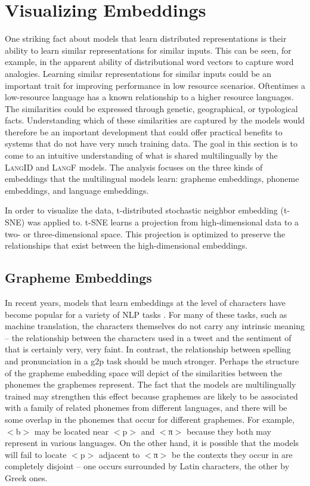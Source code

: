 \section{Visualizing Embeddings}
One striking fact about models that learn distributed representations is their ability to learn similar representations for similar inputs. This can be seen, for example, in the apparent ability of distributional word vectors to capture word analogies. Learning similar representations for similar inputs could be an important trait for improving performance in low resource scenarios. Oftentimes a low-resource language has a known relationship to a higher resource languages. The similarities could be expressed through genetic, geographical, or typological facts. Understanding which of these similarities are captured by the models would therefore be an important development that could offer practical benefits to systems that do not have very much training data. The goal in this section is to come to an intuitive understanding of what is shared multilingually by the \textsc{LangID} and \textsc{LangF} models. The analysis focuses on the three kinds of embeddings that the multilingual models learn: grapheme embeddings, phoneme embeddings, and language embeddings.

In order to visualize the data, t-distributed stochastic neighbor embedding (t-SNE) \citep{maaten2008visualizing} was applied to. t-SNE learns a projection from high-dimensional data to a two- or three-dimensional space. This projection is optimized to preserve the relationships that exist between the high-dimensional embeddings.

\subsection{Grapheme Embeddings}
In recent years, models that learn embeddings at the level of characters have become popular for a variety of NLP tasks \citep[\it inter alia]{kim2016character,ostling2017continuous,lee2016fully}. For many of these tasks, such as machine translation, the characters themselves do not carry any intrinsic meaning -- the relationship between the characters used in a tweet and the sentiment of that is certainly very, very faint. In contrast, the relationship between spelling and pronunciation in a g2p task should be much stronger. Perhaps the structure of the grapheme embedding space will depict of the similarities between the phonemes the graphemes represent. The fact that the models are multilingually trained may strengthen this effect because graphemes are likely to be associated with a family of related phonemes from different languages, and there will be some overlap in the phonemes that occur for different graphemes. For example, $<$b$>$ may be located near $<$p$>$ and $<$\textgreek{π}$>$ because they both may represent  in various languages. On the other hand, it is possible that the models will fail to locate $<$p$>$ adjacent to $<$\textgreek{π}$>$ be the contexts they occur in are completely disjoint -- one occurs surrounded by Latin characters, the other by Greek ones. 

